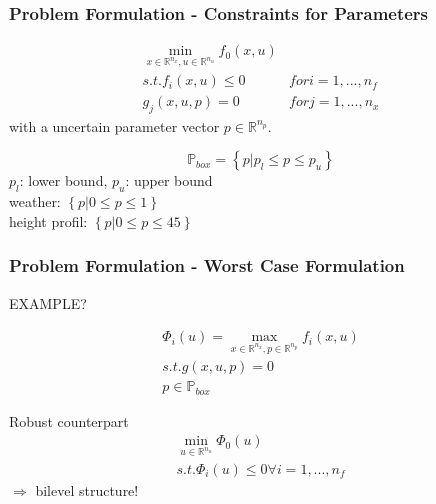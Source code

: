 

\begin{frame}
\frametitle{Problem Formulation - Constraints for Parameters}

\begin{block}
	
\begin{align*}
\min_{x\in \mathbb{R}^{n_{x}}, u\in \mathbb{R}^{n_{u}}} f_{0}(x, u)\\
s.t. f_{i}(x,u)\leq 0 &for i=1,...,n_{f}\\
g_{j}(x,u,p)=0 &for j=1,...,n_{x}
\end{align*}
with a uncertain parameter vector $p\in \mathbb{R}^{n_{p}}$.

\end{block}


\begin{block}

\begin{equation*}
\mathbb{P}_{box}=\left\{\left. p \right| p_{l}\leq p \leq p_{u}\right\}
\end{equation*}
$p_{l}$: lower bound, $p_{u}$: upper bound\\

weather: $\left\{\left. p \right| 0\leq p\leq 1\right\}$\\
height profil: $\left\{\left. p \right| 0\leq p\leq 45\right\}$

\end{block}

\end{frame}


\begin{frame}
\frametitle{Problem Formulation - Worst Case Formulation}

EXAMPLE?

\begin{align*}
\Phi_{i}(u)=\max_{x\in \mathbb{R}^{n_{x}}, p\in \mathbb{R}^{n_{p}}} f_{i}(x,u)\\
	s.t. g(x,u,p)=0\\
	p\in\mathbb{P}_{box}
\end{align*}

\begin{block}{Robust counterpart}
\begin{align*}
\min_{u\in\mathbb{R}^{n_{u}}} \Phi_{0}(u)\\
s.t. \Phi_{i}(u)\leq 0 \forall i=1,...,n_{f}
\end{align*}
$\Rightarrow$ bilevel structure!
\end{block}

\end{frame}

